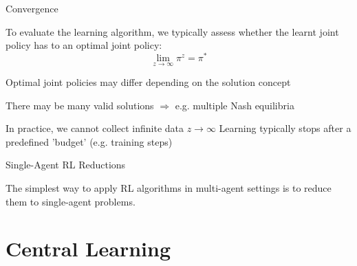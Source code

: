 \begin{frame}{Convergence}

To evaluate the learning algorithm, we typically assess whether the learnt joint policy has  to an optimal joint policy:
\vspace{0pt}
\[
\lim_{z \to \infty}\pi^z = \pi^*
\]

\blist
    \item Optimal joint policies may differ depending on the solution concept
    \item There may be many valid solutions $\Rightarrow$ e.g. multiple Nash equilibria
    \item In practice, we cannot collect infinite data $z \to \infty$
    \listtab Learning typically stops after a predefined 'budget' (e.g. training steps)
\elist
    
\end{frame}


\begin{frame}[t]{Single-Agent RL Reductions}

The simplest way to apply RL algorithms in multi-agent settings is to reduce them to single-agent problems. 

\vspace{10pt}


    
\end{frame}

\section{Central Learning}

